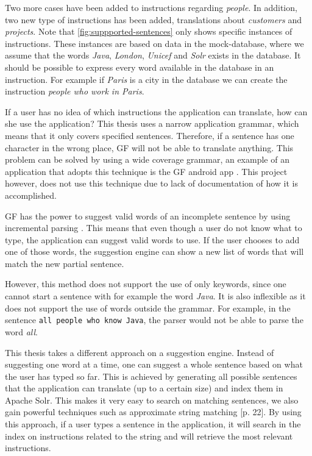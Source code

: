 Two more cases have been added to instructions regarding \emph{people}. In addition, two new type of instructions has been added, translations about \emph{customers} and \emph{projects}. Note that \autoref{fig:suppported-sentences} only shows specific instances of instructions. These instances are based on data in the mock-database, where we assume that the words \emph{Java}, \emph{London}, \emph{Unicef} and \emph{Solr} exists in the database. It should be possible to express every word available in the database in an instruction. For example if \emph{Paris} is a city in the database we can create the instruction \emph{people who work in Paris}.

If a user has no idea of which instructions the application can translate, how can she use the application? This thesis uses a narrow application grammar, which means that it only covers specified sentences. Therefore, if a sentence has one character in the wrong place, GF will not be able to
translate anything. This problem can be solved by using a wide coverage grammar, an example of an application that adopts this technique is the GF android app \cite[p. 41]{angelov2014speech}. This project however, does not use this technique due to lack of documentation of how it is accomplished.

GF has the power to suggest valid words of an incomplete sentence by using incremental parsing \cite{angelov09:incremental-parser}. This means that even though a user do not know what to type, the application can suggest valid words to use. If the user chooses to add one of those words, the suggestion engine can show a new list of words that will match the new partial sentence.

However, this method does not support the use of only keywords, since one cannot start a sentence with for example the word \emph{Java}. It is also inflexible as it does not support the use of words outside the grammar. For example, in the sentence \texttt{all people who know Java}, the parser would not be able to parse the word \emph{all}.

This thesis takes a different approach on a suggestion engine. Instead of suggesting one word at a time, one can suggest a whole sentence based on what the user has typed so far. This is achieved by generating all possible sentences that the application can translate (up to a certain size) and index them in Apache Solr. This makes it very easy to search on matching sentences, we also gain powerful techniques such as approximate string matching \cite{bialecki:2012}[p. 22].
\newline
\newline
By using this approach, if a user types a sentence in the application, it will search in the index on instructions related to the string and will retrieve the most relevant instructions.

